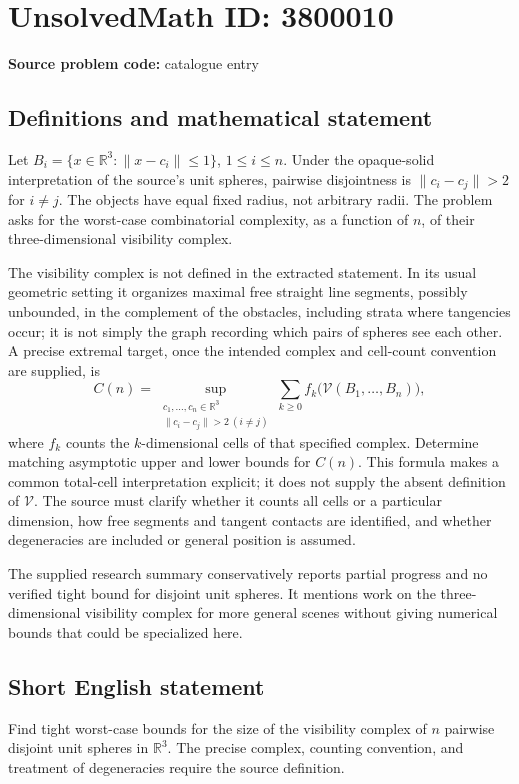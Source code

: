 \documentclass[11pt]{article}
\newcommand{\R}{\mathbb{R}}
\begin{document}
\section*{UnsolvedMath ID: 3800010}
\textbf{Source problem code:} catalogue entry
\subsection{Definitions and mathematical statement}
Let \(B_i=\{x\in\R^3:\|x-c_i\|\le1\}\), \(1\le i\le n\). Under the opaque-solid interpretation of the source's unit spheres, pairwise disjointness is \(\|c_i-c_j\|>2\) for \(i\ne j\). The objects have equal fixed radius, not arbitrary radii. The problem asks for the worst-case combinatorial complexity, as a function of \(n\), of their three-dimensional visibility complex.

The visibility complex is not defined in the extracted statement. In its usual geometric setting it organizes maximal free straight line segments, possibly unbounded, in the complement of the obstacles, including strata where tangencies occur; it is not simply the graph recording which pairs of spheres see each other. A precise extremal target, once the intended complex and cell-count convention are supplied, is
\[
C(n)=\sup_{\substack{c_1,\ldots,c_n\in\R^3\\
\|c_i-c_j\|>2\ (i\ne j)}}
\sum_{k\ge0}f_k\bigl(\mathcal V(B_1,\ldots,B_n)\bigr),
\]
where \(f_k\) counts the \(k\)-dimensional cells of that specified complex. Determine matching asymptotic upper and lower bounds for \(C(n)\). This formula makes a common total-cell interpretation explicit; it does not supply the absent definition of \(\mathcal V\). The source must clarify whether it counts all cells or a particular dimension, how free segments and tangent contacts are identified, and whether degeneracies are included or general position is assumed.

The supplied research summary conservatively reports partial progress and no verified tight bound for disjoint unit spheres. It mentions work on the three-dimensional visibility complex for more general scenes without giving numerical bounds that could be specialized here.
\subsection{Short English statement}
Find tight worst-case bounds for the size of the visibility complex of \(n\) pairwise disjoint unit spheres in \(\R^3\). The precise complex, counting convention, and treatment of degeneracies require the source definition.
\end{document}
